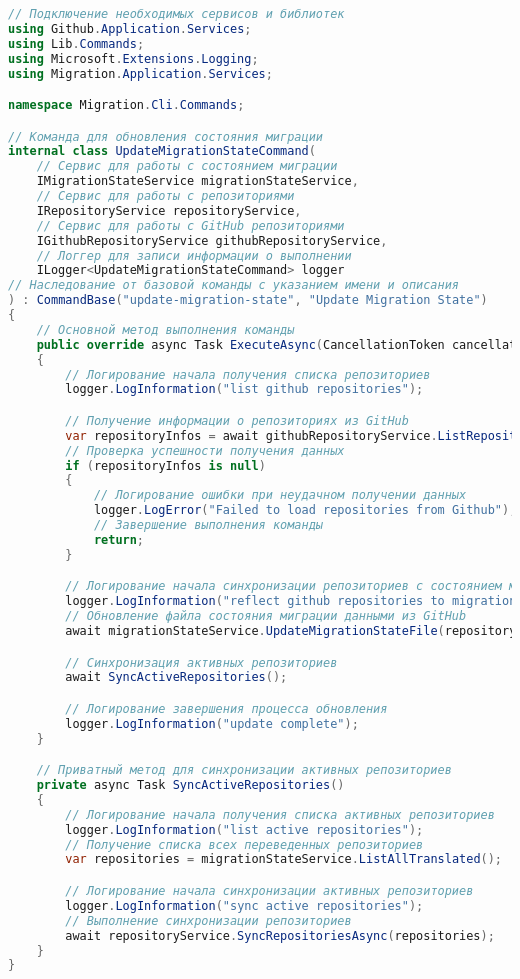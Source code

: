 \begin{lstlisting}[language=c#,label={lst:update-migration-state-command},caption={Код команды обновления информации о репозиториях}]
// Подключение необходимых сервисов и библиотек
using Github.Application.Services;
using Lib.Commands;
using Microsoft.Extensions.Logging;
using Migration.Application.Services;

namespace Migration.Cli.Commands;

// Команда для обновления состояния миграции
internal class UpdateMigrationStateCommand(
    // Сервис для работы с состоянием миграции
    IMigrationStateService migrationStateService,
    // Сервис для работы с репозиториями
    IRepositoryService repositoryService,
    // Сервис для работы с GitHub репозиториями
    IGithubRepositoryService githubRepositoryService,
    // Логгер для записи информации о выполнении
    ILogger<UpdateMigrationStateCommand> logger
// Наследование от базовой команды с указанием имени и описания
) : CommandBase("update-migration-state", "Update Migration State")
{
    // Основной метод выполнения команды
    public override async Task ExecuteAsync(CancellationToken cancellationToken)
    {
        // Логирование начала получения списка репозиториев
        logger.LogInformation("list github repositories");

        // Получение информации о репозиториях из GitHub
        var repositoryInfos = await githubRepositoryService.ListRepositoriesAsync();
        // Проверка успешности получения данных
        if (repositoryInfos is null)
        {
            // Логирование ошибки при неудачном получении данных
            logger.LogError("Failed to load repositories from Github");
            // Завершение выполнения команды
            return;
        }

        // Логирование начала синхронизации репозиториев с состоянием миграции
        logger.LogInformation("reflect github repositories to migration state");
        // Обновление файла состояния миграции данными из GitHub
        await migrationStateService.UpdateMigrationStateFile(repositoryInfos);

        // Синхронизация активных репозиториев
        await SyncActiveRepositories();

        // Логирование завершения процесса обновления
        logger.LogInformation("update complete");
    }

    // Приватный метод для синхронизации активных репозиториев
    private async Task SyncActiveRepositories()
    {
        // Логирование начала получения списка активных репозиториев
        logger.LogInformation("list active repositories");
        // Получение списка всех переведенных репозиториев
        var repositories = migrationStateService.ListAllTranslated();

        // Логирование начала синхронизации активных репозиториев
        logger.LogInformation("sync active repositories");
        // Выполнение синхронизации репозиториев
        await repositoryService.SyncRepositoriesAsync(repositories);
    }
}
\end{lstlisting}

